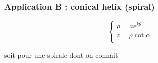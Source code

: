 

\subsubsection{Application B : conical helix (spiral)}
\begin{equation}
	\left\{
	\begin{aligned}
		\rho = a e^{k\theta}\\
		z = \rho \cot{\alpha}\\
	\end{aligned}
	\right.
\end{equation}


soit pour une spirale dont on connait


